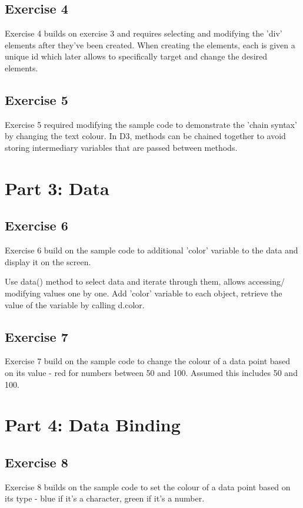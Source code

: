 \documentclass[11pt]{article}   	%
\begin{document}
\subsection{Exercise 4 }
Exercise 4 builds on exercise 3 and requires selecting and modifying the 'div' elements after they've been created. When creating the elements, each is given a unique id which later allows to specifically target and change the desired elements. 

\subsection{Exercise 5 }
Exercise 5 required modifying the sample code to demonstrate the 'chain syntax' by changing the text colour.
In D3, methods can be chained together to avoid storing intermediary variables that are passed between methods. 



\section{Part 3: Data}
\subsection{Exercise 6 }
Exercise 6 build on the sample code to additional 'color' variable to the data and display it on the screen.

Use data() method to select data and iterate through them, allows accessing/ modifying values one by one. Add 'color' variable to each object, retrieve the value of the variable by calling d.color.

\subsection{Exercise 7 }
Exercise 7 build on the sample code to change the colour of a data point based on its value - red for numbers between 50 and 100.
Assumed this includes 50 and 100.

\section{Part 4: Data Binding}
\subsection{Exercise 8 }
Exercise 8 builds on the sample code to set the colour of a data point based on its type - blue if it's a character, green if it's a number.
\end{document}
